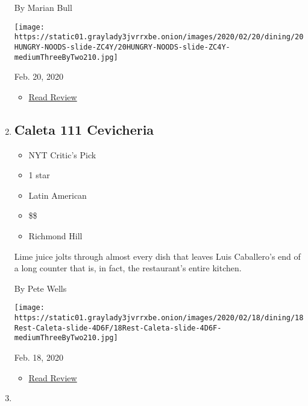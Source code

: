 \begin{enumerate}
  By Marian Bull

  \texttt{[image: https://static01.graylady3jvrrxbe.onion/images/2020/02/20/dining/20HUNGRY-NOODS-slide-ZC4Y/20HUNGRY-NOODS-slide-ZC4Y-mediumThreeByTwo210.jpg]}

  Feb. 20, 2020

  \begin{itemize}
  \tightlist
  \item
    \href{https://www.nytimes3xbfgragh.onion/2020/02/20/dining/noods-n-chill-review-thai.html?rref=collection\%2Fcollection\%2Frestaurant-guide}{Read
    Review}
  \end{itemize}
\item
  \href{https://www.nytimes3xbfgragh.onion/2020/02/18/dining/caleta-111-cevicheria-review-pete-wells.html}{}

  \hypertarget{caleta-111-cevicheria}{%
  \subsection{Caleta 111 Cevicheria}\label{caleta-111-cevicheria}}

  \begin{itemize}
  \tightlist
  \item
    NYT Critic's Pick
  \item
     1 star
  \item
    Latin American
  \item
    \$\$
  \item
    Richmond Hill
  \end{itemize}

  Lime juice jolts through almost every dish that leaves Luis
  Caballero's end of a long counter that is, in fact, the restaurant's
  entire kitchen.

  By Pete Wells

  \texttt{[image: https://static01.graylady3jvrrxbe.onion/images/2020/02/18/dining/18Rest-Caleta-slide-4D6F/18Rest-Caleta-slide-4D6F-mediumThreeByTwo210.jpg]}

  Feb. 18, 2020

  \begin{itemize}
  \tightlist
  \item
    \href{https://www.nytimes3xbfgragh.onion/2020/02/18/dining/caleta-111-cevicheria-review-pete-wells.html?rref=collection\%2Fcollection\%2Frestaurant-guide}{Read
    Review}
  \end{itemize}
\item
  \href{https://www.nytimes3xbfgragh.onion/2020/02/13/dining/joju-review-banh-mi.html}{}


\end{enumerate}
